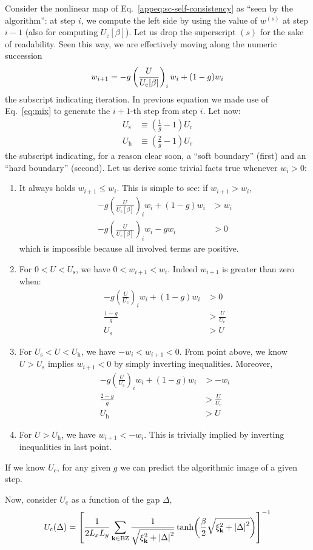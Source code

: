 Consider the nonlinear map of Eq.~\eqref{appeq:sc-self-consistency} as ``seen by the algorithm'': at step $i$, we compute the left side by using the value of $w^{(s)}$ at step $i-1$ (also for computing $U_\mathrm{c}[\beta]$). Let us drop the superscript $(s)$ for the sake of readability. Seen this way, we are effectively moving along the numeric succession
\[
	w_{i+1} = -g\left(\frac{U}{U_{\mathrm{c}}[\beta]}\right)_i w_i + (1-g) w_i \\
\]
the subscript indicating iteration. In previous equation we made use of Eq.~\eqref{eq:mix} to generate the $i+1$-th step from step $i$. Let now:
\[
\begin{aligned}
	U_\mathrm{s} &\equiv \left(\frac{1}{g}-1\right) U_{\mathrm{c}} \\
	U_\mathrm{h} &\equiv \left(\frac{2}{g}-1\right) U_{\mathrm{c}}
\end{aligned}
\]
the subscript indicating, for a reason clear soon, a ``soft boundary'' (first) and an ``hard boundary'' (second). Let us derive some trivial facts true whenever $w_i>0$:
\begin{enumerate}
	\item It always holds $w_{i+1} \le w_i$. This is simple to see: if $w_{i+1}>w_i$,
	\[
	\begin{aligned}
		-g\left(\frac{U}{U_{\mathrm{c}}[\beta]}\right)_i w_i + (1-g) w_i &> w_i \\
		-g\left(\frac{U}{U_{\mathrm{c}}[\beta]}\right)_i w_i -g w_i &> 0
	\end{aligned}
	\]
	which is impossible because all involved terms are positive.
	\item For $0 < U < U_\mathrm{s}$, we have $0 < w_{i+1} < w_i$. Indeed $w_{i+1}$ is greater than zero when:
	\[
	\begin{aligned}
		-g\left(\frac{U}{U_{\mathrm{c}}}\right)_i w_i + (1-g) w_i &> 0 \\
		\frac{1-g}{g} &> \frac{U}{U_{\mathrm{c}}} \\
		U_\mathrm{s} &> U 
	\end{aligned}
	\]
	\item For $U_\mathrm{s} < U < U_\mathrm{h}$, we have $-w_i < w_{i+1} < 0$. From point above, we know $U>U_\mathrm{s}$ implies $w_{i+1} < 0$ by simply inverting inequalities. Moreover,
	\[
	\begin{aligned}
		-g\left(\frac{U}{U_{\mathrm{c}}}\right)_i w_i + (1-g) w_i &> -w_i \\
		\frac{2-g}{g} &> \frac{U}{U_{\mathrm{c}}} \\
		U_\mathrm{h} &> U 
	\end{aligned}	
	\]
	\item For $U > U_\mathrm{h}$, we have $w_{i+1} < -w_i$. This is trivially implied by inverting inequalities in last point.
\end{enumerate}
If we know $U_\mathrm{c}$, for any given $g$ we can predict the algorithmic image of a given step.

Now, consider $U_\mathrm{c}$ as a function of the gap $\Delta$,
\[
	U_\mathrm{c}(\Delta) = \left[
		\frac{1}{2 L_x L_y} \sum_{\mathbf{k}\in\mathrm{BZ}} \frac{1}{\sqrt{\xi_\mathbf{k}^2 + \abs{\Delta}^2}} \tanh(
			\frac{\beta}{2} \sqrt{\xi_\mathbf{k}^2 + \abs{\Delta}^2}
		)
	\right]^{-1}
\]
\todo